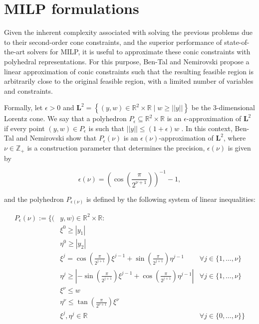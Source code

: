 \documentclass[pdflatex,sn-mathphys-num]{sn-jnl}%
\begin{document}
\section{MILP formulations}\label{sec4}

Given the inherent complexity associated with solving the previous problems due to their second-order cone constraints, and the superior performance of state-of-the-art solvers for MILP, it is useful to approximate these conic constraints with polyhedral representations. For this purpose, Ben-Tal and Nemirovski \cite{extended} propose a linear approximation of conic constraints such that the resulting feasible region is arbitrarily close to the original feasible region, with a limited number of variables and constraints.

Formally, let $\epsilon > 0$ and $\mathbf{L}^2 = \left\{(y,w) \in \mathbb{R}^2 \times \mathbb{R} \mid w \geq ||y||\right\}$ be the 3-dimensional Lorentz cone. We say that a polyhedron $P_\epsilon \subseteq \mathbb{R}^2 \times \mathbb{R}$ is an $\epsilon$-approximation of $\mathbf{L}^2$ if every point $(y,w) \in P_\epsilon$ is such that $||y||\leq (1+\epsilon)w$
.
In this context, Ben-Tal and Nemirovski \cite{extended} show that $P_\epsilon(\nu)$ is an $\epsilon(\nu)$-approximation of $\mathbf{L}^2$, where $\nu \in \mathbb{Z}_+$ is a construction parameter that determines the precision, $\epsilon(\nu)$ is given by

\begin{equation*}
    \epsilon(\nu) = \left(\cos\left(\frac{\pi}{2^{\nu + 1}}\right)\right)^{-1} - 1,
\end{equation*}

and the polyhedron $P_{\epsilon(\nu)}$ is defined by the following system of linear inequalities:

\begin{subequations}
\begin{align}
    P_\epsilon(\nu) := \bigg\{(&y,w) \in \mathbb{R}^2 \times \mathbb{R}:\\
    &\xi^0 \geq |y_1| \label{ext-first}\\
    &\eta^0 \geq |y_2| \\
    &\xi^j = \cos\left(\frac{\pi}{2^{j+1}}\right)\xi^{j-1} + \sin\left(\frac{\pi}{2^{j+1}}\right) \eta^{j-1} & \forall j \in \{1,\dots,\nu\}\\
    &\eta^j \geq \left| -\sin\left(\frac{\pi}{2^{j+1}}\right) \xi^{j-1} + \cos\left(\frac{\pi}{2^{j+1}}\right) \eta^{j-1}\right| & \forall j \in \{1,\dots,\nu\}\\
    &\xi^\nu \leq w \\
    &\eta^\nu \leq \tan\left(\frac{\pi}{2^{\nu + 1}}\right) \xi^\nu \label{ext-last}\\
    & \xi^j, \eta^j \in \mathbb{R} & \forall j \in \{0,\dots,\nu\} \bigg\} \label{ext-variables}
\end{align}
\end{subequations}  
\end{document}

